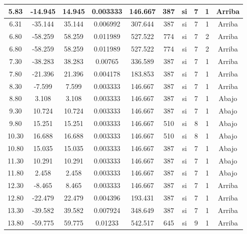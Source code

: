 \begin{table}[H]
{\begin{tabular}{|c|c|c|c|c|c|c|c|c|c|}
    \hline
    5.83 & -14.945 & 14.945 & 0.003333 & 146.667 & 387 & si  & 7   & 1   & Arriba \bigstrut\\
    \hline
    6.31 & -35.144 & 35.144 & 0.006992 & 307.644 & 387 & si  & 7   & 1   & Arriba \bigstrut\\
    \hline
    6.80 & -58.259 & 58.259 & 0.011989 & 527.522 & 774 & si  & 7   & 2   & Arriba \bigstrut\\
    \hline
    6.80 & -58.259 & 58.259 & 0.011989 & 527.522 & 774 & si  & 7   & 2   & Arriba \bigstrut\\
    \hline
    7.30 & -38.283 & 38.283 & 0.00765 & 336.589 & 387 & si  & 7   & 1   & Arriba \bigstrut\\
    \hline
    7.80 & -21.396 & 21.396 & 0.004178 & 183.853 & 387 & si  & 7   & 1   & Arriba \bigstrut\\
    \hline
    8.30 & -7.599 & 7.599 & 0.003333 & 146.667 & 387 & si  & 7   & 1   & Arriba \bigstrut\\
    \hline
    8.80 & 3.108 & 3.108 & 0.003333 & 146.667 & 387 & si  & 7   & 1   & Abajo \bigstrut\\
    \hline
    9.30 & 10.724 & 10.724 & 0.003333 & 146.667 & 387 & si  & 7   & 1   & Abajo \bigstrut\\
    \hline
    9.80 & 15.251 & 15.251 & 0.003333 & 146.667 & 510 & si  & 8   & 1   & Abajo \bigstrut\\
    \hline
    10.30 & 16.688 & 16.688 & 0.003333 & 146.667 & 510 & si  & 8   & 1   & Abajo \bigstrut\\
    \hline
    10.80 & 15.035 & 15.035 & 0.003333 & 146.667 & 387 & si  & 7   & 1   & Abajo \bigstrut\\
    \hline
    11.30 & 10.291 & 10.291 & 0.003333 & 146.667 & 387 & si  & 7   & 1   & Abajo \bigstrut\\
    \hline
    11.80 & 2.458 & 2.458 & 0.003333 & 146.667 & 387 & si  & 7   & 1   & Abajo \bigstrut\\
    \hline
    12.30 & -8.465 & 8.465 & 0.003333 & 146.667 & 387 & si  & 7   & 1   & Arriba \bigstrut\\
    \hline
    12.80 & -22.479 & 22.479 & 0.004396 & 193.431 & 387 & si  & 7   & 1   & Arriba \bigstrut\\
    \hline
    13.30 & -39.582 & 39.582 & 0.007924 & 348.649 & 387 & si  & 7   & 1   & Arriba \bigstrut\\
    \hline
    13.80 & -59.775 & 59.775 & 0.01233 & 542.517 & 645 & si  & 9   & 1   & Arriba \bigstrut\\
    \hline

\end{tabular}}
\end{table}
